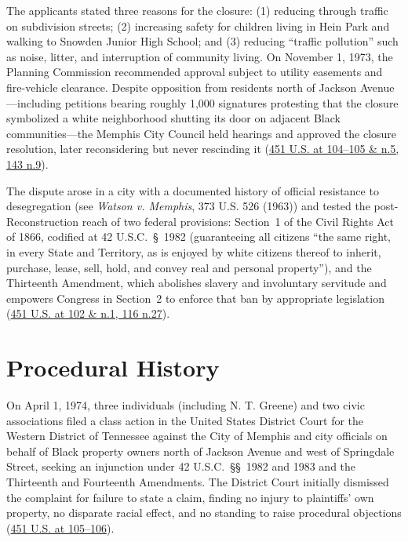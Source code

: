 \documentclass[12pt]{article}
\begin{document}
The applicants stated three reasons for the closure: (1) reducing through traffic on subdivision streets; (2) increasing safety for children living in Hein Park and walking to Snowden Junior High School; and (3) reducing ``traffic pollution'' such as noise, litter, and interruption of community living. On November 1, 1973, the Planning Commission recommended approval subject to utility easements and fire-vehicle clearance. Despite opposition from residents north of Jackson Avenue---including petitions bearing roughly 1,000 signatures protesting that the closure symbolized a white neighborhood shutting its door on adjacent Black communities---the Memphis City Council held hearings and approved the closure resolution, later reconsidering but never rescinding it (\href{https://supreme.justia.com/cases/federal/us/451/100/}{451 U.S. at 104--105 \& n.5, 143 n.9}).

The dispute arose in a city with a documented history of official resistance to desegregation (see \textit{Watson v. Memphis}, 373 U.S. 526 (1963)) and tested the post-Reconstruction reach of two federal provisions: Section~1 of the Civil Rights Act of 1866, codified at 42 U.S.C.\ \S~1982 (guaranteeing all citizens ``the same right, in every State and Territory, as is enjoyed by white citizens thereof to inherit, purchase, lease, sell, hold, and convey real and personal property''), and the Thirteenth Amendment, which abolishes slavery and involuntary servitude and empowers Congress in Section~2 to enforce that ban by appropriate legislation (\href{https://supreme.justia.com/cases/federal/us/451/100/}{451 U.S. at 102 \& n.1, 116 n.27}).

\section{Procedural History}

On April 1, 1974, three individuals (including N. T. Greene) and two civic associations filed a class action in the United States District Court for the Western District of Tennessee against the City of Memphis and city officials on behalf of Black property owners north of Jackson Avenue and west of Springdale Street, seeking an injunction under 42 U.S.C.\ \S\S~1982 and 1983 and the Thirteenth and Fourteenth Amendments. The District Court initially dismissed the complaint for failure to state a claim, finding no injury to plaintiffs' own property, no disparate racial effect, and no standing to raise procedural objections (\href{https://supreme.justia.com/cases/federal/us/451/100/}{451 U.S. at 105--106}).
\end{document}
